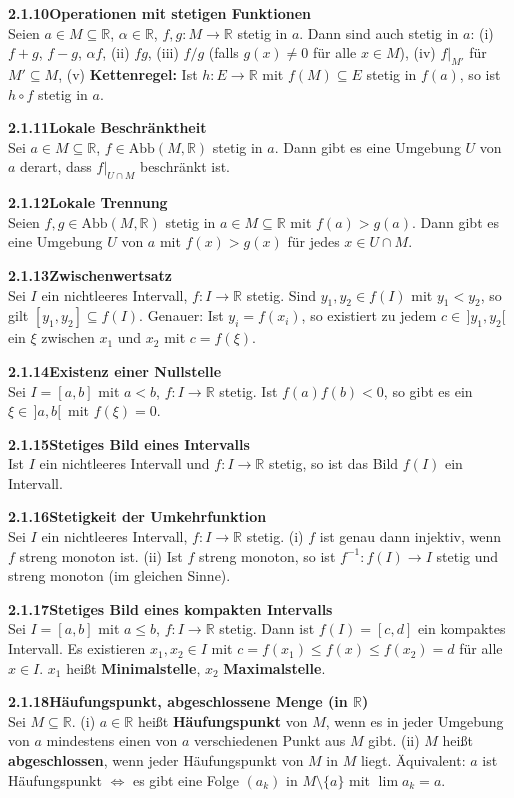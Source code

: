 \documentclass[a4paper,12pt]{article}
\newcommand{\gentry}[3]{%
  \noindent\textbf{#1\quad #2}\nopagebreak\\[0.2em]
  #3\par\smallskip
}
\begin{document}
\gentry{2.1.10}{Operationen mit stetigen Funktionen}{%
  Seien $a \in M \subseteq \mathbb{R}$, $\alpha \in \mathbb{R}$, $f, g: M \to \mathbb{R}$ stetig in $a$.
  Dann sind auch stetig in $a$:
  (i) $f + g$, $f - g$, $\alpha f$, \quad
  (ii) $fg$, \quad
  (iii) $f/g$ (falls $g(x) \neq 0$ für alle $x \in M$), \quad
  (iv) $f|_{M'}$ für $M' \subseteq M$, \quad
  (v) \textbf{Kettenregel:} Ist $h: E \to \mathbb{R}$ mit $f(M) \subseteq E$ stetig in $f(a)$,
  so ist $h \circ f$ stetig in $a$.
}

\gentry{2.1.11}{Lokale Beschränktheit}{%
  Sei $a \in M \subseteq \mathbb{R}$, $f \in \mathrm{Abb}(M, \mathbb{R})$ stetig in $a$.
  Dann gibt es eine Umgebung $U$ von $a$ derart, dass $f|_{U \cap M}$ beschränkt ist.
}

\gentry{2.1.12}{Lokale Trennung}{%
  Seien $f, g \in \mathrm{Abb}(M, \mathbb{R})$ stetig in $a \in M \subseteq \mathbb{R}$
  mit $f(a) > g(a)$. Dann gibt es eine Umgebung $U$ von $a$ mit
  $f(x) > g(x)$ für jedes $x \in U \cap M$.
}

\gentry{2.1.13}{Zwischenwertsatz}{%
  Sei $I$ ein nichtleeres Intervall, $f: I \to \mathbb{R}$ stetig. Sind
  $y_1, y_2 \in f(I)$ mit $y_1 < y_2$, so gilt $[y_1, y_2] \subseteq f(I)$.
  Genauer: Ist $y_i = f(x_i)$, so existiert zu jedem $c \in \,]y_1, y_2[\,$ ein
  $\xi$ zwischen $x_1$ und $x_2$ mit $c = f(\xi)$.
}

\gentry{2.1.14}{Existenz einer Nullstelle}{%
  Sei $I = [a, b]$ mit $a < b$, $f: I \to \mathbb{R}$ stetig. Ist
  $f(a)f(b) < 0$, so gibt es ein $\xi \in \,]a, b[\,$ mit $f(\xi) = 0$.
}

\gentry{2.1.15}{Stetiges Bild eines Intervalls}{%
  Ist $I$ ein nichtleeres Intervall und $f: I \to \mathbb{R}$ stetig, so ist
  das Bild $f(I)$ ein Intervall.
}

\gentry{2.1.16}{Stetigkeit der Umkehrfunktion}{%
  Sei $I$ ein nichtleeres Intervall, $f: I \to \mathbb{R}$ stetig.
  (i) $f$ ist genau dann injektiv, wenn $f$ streng monoton ist.
  (ii) Ist $f$ streng monoton, so ist $f^{-1}: f(I) \to I$ stetig und
  streng monoton (im gleichen Sinne).
}

\gentry{2.1.17}{Stetiges Bild eines kompakten Intervalls}{%
  Sei $I = [a, b]$ mit $a \leq b$, $f: I \to \mathbb{R}$ stetig. Dann ist
  $f(I) = [c, d]$ ein kompaktes Intervall. Es existieren $x_1, x_2 \in I$ mit
  $c = f(x_1) \leq f(x) \leq f(x_2) = d$ für alle $x \in I$.
  $x_1$ heißt \textbf{Minimalstelle}, $x_2$ \textbf{Maximalstelle}.
}

\gentry{2.1.18}{Häufungspunkt, abgeschlossene Menge (in $\mathbb{R}$)}{%
  Sei $M \subseteq \mathbb{R}$.
  (i) $a \in \mathbb{R}$ heißt \textbf{Häufungspunkt} von $M$, wenn es in jeder
  Umgebung von $a$ mindestens einen von $a$ verschiedenen Punkt aus $M$ gibt.
  (ii) $M$ heißt \textbf{abgeschlossen}, wenn jeder Häufungspunkt von $M$ in $M$ liegt.
  Äquivalent: $a$ ist Häufungspunkt $\Leftrightarrow$ es gibt eine Folge $(a_k)$
  in $M \setminus \{a\}$ mit $\lim a_k = a$.
}
\end{document}
